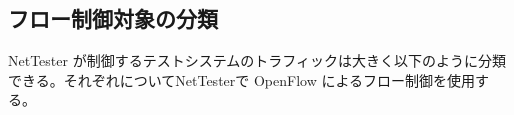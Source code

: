 
  \subsection{フロー制御対象の分類}
  \label{sec:flow-design-grouping}

NetTester が制御するテストシステムのトラフィックは大きく以下のように分類
できる。それぞれについてNetTesterで OpenFlow によるフロー制御を使用する。

